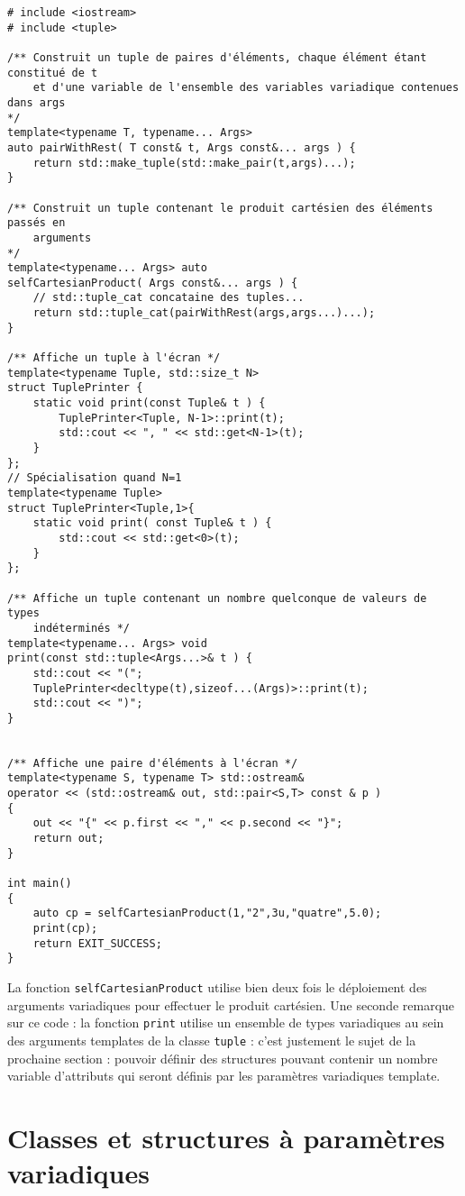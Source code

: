 \documentclass[a4]{article}
\begin{document}
\begin{lstlisting}
# include <iostream>
# include <tuple>

/** Construit un tuple de paires d'éléments, chaque élément étant constitué de t  
    et d'une variable de l'ensemble des variables variadique contenues dans args
*/
template<typename T, typename... Args>
auto pairWithRest( T const& t, Args const&... args ) {
    return std::make_tuple(std::make_pair(t,args)...);
}

/** Construit un tuple contenant le produit cartésien des éléments passés en 
    arguments
*/
template<typename... Args> auto
selfCartesianProduct( Args const&... args ) {
    // std::tuple_cat concataine des tuples...
    return std::tuple_cat(pairWithRest(args,args...)...);
}

/** Affiche un tuple à l'écran */
template<typename Tuple, std::size_t N>
struct TuplePrinter {
    static void print(const Tuple& t ) {
        TuplePrinter<Tuple, N-1>::print(t);
        std::cout << ", " << std::get<N-1>(t);
    }
};
// Spécialisation quand N=1
template<typename Tuple>
struct TuplePrinter<Tuple,1>{
    static void print( const Tuple& t ) {
        std::cout << std::get<0>(t);
    }
};

/** Affiche un tuple contenant un nombre quelconque de valeurs de types 
    indéterminés */
template<typename... Args> void
print(const std::tuple<Args...>& t ) {
    std::cout << "(";
    TuplePrinter<decltype(t),sizeof...(Args)>::print(t);
    std::cout << ")";
}


/** Affiche une paire d'éléments à l'écran */
template<typename S, typename T> std::ostream&
operator << (std::ostream& out, std::pair<S,T> const & p )
{
    out << "{" << p.first << "," << p.second << "}";
    return out;
}

int main()
{
    auto cp = selfCartesianProduct(1,"2",3u,"quatre",5.0);
    print(cp);
    return EXIT_SUCCESS;
}
\end{lstlisting}

La fonction \verb$selfCartesianProduct$ utilise bien deux fois le déploiement des arguments variadiques pour effectuer le produit
cartésien. Une seconde remarque sur ce code : la fonction \verb$print$ utilise un ensemble de types variadiques au sein des arguments
templates de la classe \verb$tuple$ : c'est justement le sujet de la prochaine section : pouvoir définir des structures pouvant contenir
un nombre variable d'attributs qui seront définis par les paramètres variadiques template.

\section{Classes et structures à paramètres variadiques}
\end{document}
